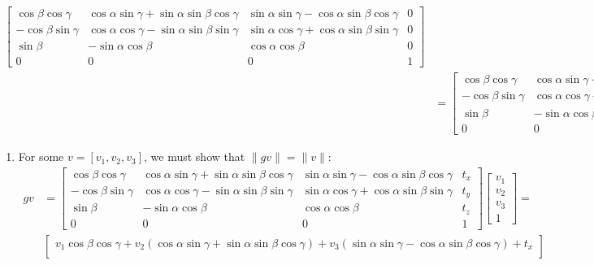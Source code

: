 \documentclass[12pt]{article}
\begin{document}
\begin{enumerate}
\begin{align*}
\begin{bmatrix}
	\cos\beta \cos\gamma & \cos\alpha \sin\gamma+ \sin\alpha \sin\beta \cos\gamma & \sin\alpha \sin\gamma - \cos\alpha \sin\beta \cos\gamma & 0 \\
	-\cos\beta \sin\gamma & \cos\alpha \cos\gamma - \sin\alpha \sin\beta \sin\gamma & \sin\alpha \cos\gamma + \cos\alpha \sin\beta \sin\gamma & 0 \\
	\sin\beta & -\sin\alpha \cos\beta & \cos\alpha\cos\beta & 0 \\
	0 & 0 & 0 & 1 \end{bmatrix} \\
	&= \begin{bmatrix} \cos\beta \cos\gamma & \cos\alpha \sin\gamma+ \sin\alpha \sin\beta \cos\gamma & \sin\alpha \sin\gamma - \cos\alpha \sin\beta \cos\gamma & t_x \\
	-\cos\beta \sin\gamma & \cos\alpha \cos\gamma - \sin\alpha \sin\beta \sin\gamma & \sin\alpha \cos\gamma + \cos\alpha \sin\beta \sin\gamma & t_y \\
	\sin\beta & -\sin\alpha \cos\beta & \cos\alpha\cos\beta & t_z \\
	0 & 0 & 0 & 1 \end{bmatrix}
	\end{align*}
	\begin{enumerate}
		\item For some $v = [v_1, v_2, v_3]$, we must show that $\|gv\| = \|v\|$:
		\begin{align*}
		gv &= \begin{bmatrix} \cos\beta \cos\gamma & \cos\alpha \sin\gamma + \sin\alpha \sin\beta \cos\gamma & \sin\alpha \sin\gamma - \cos\alpha \sin\beta \cos\gamma & t_x \\
		-\cos\beta \sin\gamma & \cos\alpha \cos\gamma - \sin\alpha \sin\beta \sin\gamma & \sin\alpha \cos\gamma + \cos\alpha \sin\beta \sin\gamma & t_y \\
		\sin\beta & -\sin\alpha \cos\beta & \cos\alpha\cos\beta & t_z \\
		0 & 0 & 0 & 1 \end{bmatrix} \begin{bmatrix} v_1 \\ v_2 \\ v_3 \\ 1 \end{bmatrix} = \\
		&\begin{bmatrix}
		v_1\cos\beta\cos\gamma + v_2 (\cos\alpha \sin\gamma + \sin\alpha \sin\beta \cos\gamma)  + v_3 (\sin\alpha \sin\gamma - \cos\alpha \sin\beta \cos\gamma) + t_x \\

\end{bmatrix}
\end{align*}
\end{enumerate}
\end{enumerate}
\end{document}
